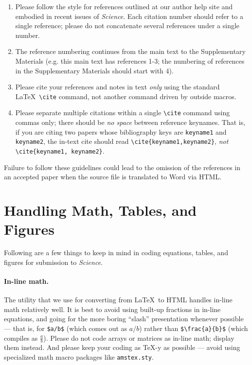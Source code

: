 \documentclass[12pt]{article}
\begin{document}
\begin{enumerate}
\item Please follow the style for references outlined at our author
  help site and embodied in recent issues of {\it Science}.  Each
  citation number should refer to a single reference; please do not
  concatenate several references under a single number.
\item The reference numbering  continues from the 
main text to the Supplementary Materials (e.g. this main 
text has references 1-3; the numbering of references in the 
Supplementary Materials should start with 4). 
\item Please cite your references and notes in text {\it only\/} using
  the standard \LaTeX\ \verb+\cite+ command, not another command
  driven by outside macros.
\item Please separate multiple citations within a single \verb+\cite+
  command using commas only; there should be {\it no space\/}
  between reference keynames.  That is, if you are citing two
  papers whose bibliography keys are \texttt{keyname1} and
  \texttt{keyname2}, the in-text cite should read
  \verb+\cite{keyname1,keyname2}+, {\it not\/}
  \verb+\cite{keyname1, keyname2}+.
\end{enumerate}

\noindent Failure to follow these guidelines could lead
to the omission of the references in an accepted paper when the source
file is translated to Word via HTML.



\section*{Handling Math, Tables, and Figures}

Following are a few things to keep in mind in coding equations,
tables, and figures for submission to {\it Science}.

\paragraph*{In-line math.}  The utility that we use for converting
from \LaTeX\ to HTML handles in-line math relatively well.  It is best
to avoid using built-up fractions in in-line equations, and going for
the more boring ``slash'' presentation whenever possible --- that is,
for \verb+$a/b$+ (which comes out as $a/b$) rather than
\verb+$\frac{a}{b}$+ (which compiles as $\frac{a}{b}$).  
 Please do not code arrays or matrices as
in-line math; display them instead.  And please keep your coding as
\TeX-y as possible --- avoid using specialized math macro packages
like \texttt{amstex.sty}.
\end{document}
